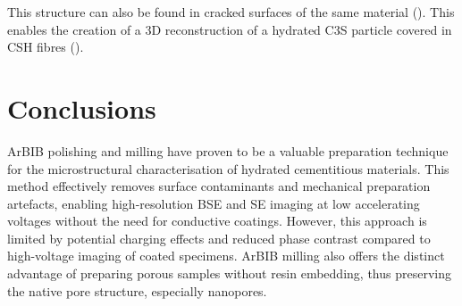 This structure can also be found in cracked surfaces of the same material ().
This enables the creation of a 3D reconstruction of a hydrated \ac{C3S} particle covered in \ac{CSH} fibres ().

\section{Conclusions}

\ac{ArBIB} polishing and milling have proven to be a valuable preparation technique for the microstructural characterisation of hydrated cementitious materials.
This method effectively removes surface contaminants and mechanical preparation artefacts, enabling high-resolution \ac{BSE} and \ac{SE} imaging at low accelerating voltages without the need for conductive coatings.
However, this approach is limited by potential charging effects and reduced phase contrast compared to high-voltage imaging of coated specimens.
\ac{ArBIB} milling also offers the distinct advantage of preparing porous samples without resin embedding, thus preserving the native pore structure, especially nanopores.
